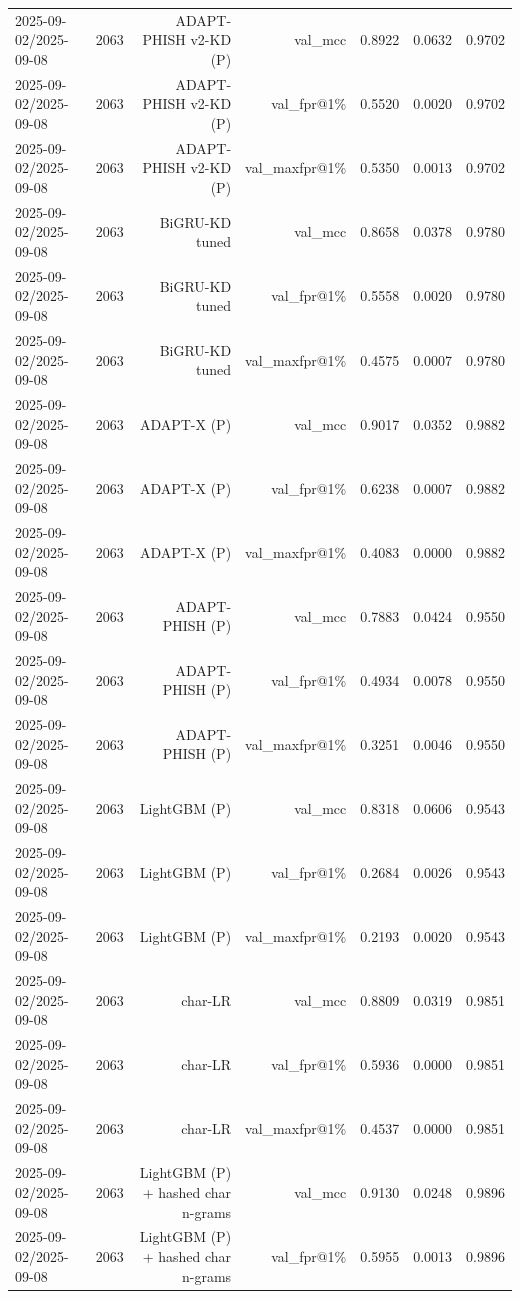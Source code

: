 \begin{table}[t]
\begin{tabular}{llrrrrr}
2025-09-02/2025-09-08 & 2063 & ADAPT-PHISH v2-KD (P) & val\_mcc & 0.8922 & 0.0632 & 0.9702 \\
2025-09-02/2025-09-08 & 2063 & ADAPT-PHISH v2-KD (P) & val\_fpr@1\% & 0.5520 & 0.0020 & 0.9702 \\
2025-09-02/2025-09-08 & 2063 & ADAPT-PHISH v2-KD (P) & val\_maxfpr@1\% & 0.5350 & 0.0013 & 0.9702 \\
2025-09-02/2025-09-08 & 2063 & BiGRU-KD tuned & val\_mcc & 0.8658 & 0.0378 & 0.9780 \\
2025-09-02/2025-09-08 & 2063 & BiGRU-KD tuned & val\_fpr@1\% & 0.5558 & 0.0020 & 0.9780 \\
2025-09-02/2025-09-08 & 2063 & BiGRU-KD tuned & val\_maxfpr@1\% & 0.4575 & 0.0007 & 0.9780 \\
2025-09-02/2025-09-08 & 2063 & ADAPT-X (P) & val\_mcc & 0.9017 & 0.0352 & 0.9882 \\
2025-09-02/2025-09-08 & 2063 & ADAPT-X (P) & val\_fpr@1\% & 0.6238 & 0.0007 & 0.9882 \\
2025-09-02/2025-09-08 & 2063 & ADAPT-X (P) & val\_maxfpr@1\% & 0.4083 & 0.0000 & 0.9882 \\
2025-09-02/2025-09-08 & 2063 & ADAPT-PHISH (P) & val\_mcc & 0.7883 & 0.0424 & 0.9550 \\
2025-09-02/2025-09-08 & 2063 & ADAPT-PHISH (P) & val\_fpr@1\% & 0.4934 & 0.0078 & 0.9550 \\
2025-09-02/2025-09-08 & 2063 & ADAPT-PHISH (P) & val\_maxfpr@1\% & 0.3251 & 0.0046 & 0.9550 \\
2025-09-02/2025-09-08 & 2063 & LightGBM (P) & val\_mcc & 0.8318 & 0.0606 & 0.9543 \\
2025-09-02/2025-09-08 & 2063 & LightGBM (P) & val\_fpr@1\% & 0.2684 & 0.0026 & 0.9543 \\
2025-09-02/2025-09-08 & 2063 & LightGBM (P) & val\_maxfpr@1\% & 0.2193 & 0.0020 & 0.9543 \\
2025-09-02/2025-09-08 & 2063 & char-LR & val\_mcc & 0.8809 & 0.0319 & 0.9851 \\
2025-09-02/2025-09-08 & 2063 & char-LR & val\_fpr@1\% & 0.5936 & 0.0000 & 0.9851 \\
2025-09-02/2025-09-08 & 2063 & char-LR & val\_maxfpr@1\% & 0.4537 & 0.0000 & 0.9851 \\
2025-09-02/2025-09-08 & 2063 & LightGBM (P) + hashed char n-grams & val\_mcc & 0.9130 & 0.0248 & 0.9896 \\
2025-09-02/2025-09-08 & 2063 & LightGBM (P) + hashed char n-grams & val\_fpr@1\% & 0.5955 & 0.0013 & 0.9896 \\

\end{tabular}
\end{table}
